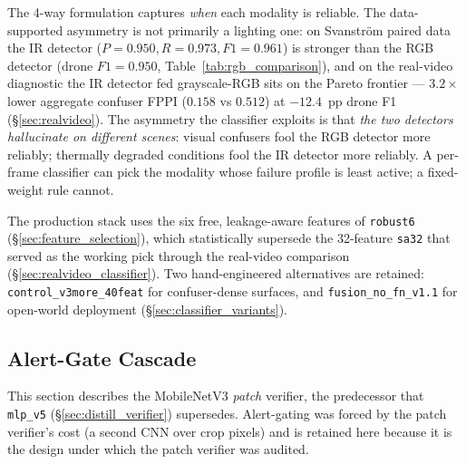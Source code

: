The 4-way formulation captures \emph{when} each modality is reliable. The data-supported asymmetry is not primarily a lighting one: on Svanstr\"om paired data the IR detector ($P=0.950, R=0.973, F1=0.961$) is stronger than the RGB detector (drone $F1=0.950$, Table~\ref{tab:rgb_comparison}), and on the real-video diagnostic the IR detector fed grayscale-RGB sits on the Pareto frontier --- $3.2\times$ lower aggregate confuser FPPI ($0.158$ vs $0.512$) at $-12.4$~pp drone F1 (\S\ref{sec:realvideo}). The asymmetry the classifier exploits is that \emph{the two detectors hallucinate on different scenes}: visual confusers fool the RGB detector more reliably; thermally degraded conditions fool the IR detector more reliably. A per-frame classifier can pick the modality whose failure profile is least active; a fixed-weight rule cannot.

The production stack uses the six free, leakage-aware features of \texttt{robust6} (\S\ref{sec:feature_selection}), which statistically supersede the 32-feature \texttt{sa32} that served as the working pick through the real-video comparison (\S\ref{sec:realvideo_classifier}). Two hand-engineered alternatives are retained: \texttt{control\_v3more\_40feat} for confuser-dense surfaces, and \texttt{fusion\_no\_fn\_v1.1} for open-world deployment (\S\ref{sec:classifier_variants}).

\subsection{Alert-Gate Cascade}
\label{sec:alert_gate}

This section describes the MobileNetV3 \emph{patch} verifier, the predecessor that \texttt{mlp\_v5} (\S\ref{sec:distill_verifier}) supersedes. Alert-gating was forced by the patch verifier's cost (a second CNN over crop pixels) and is retained here because it is the design under which the patch verifier was audited.

